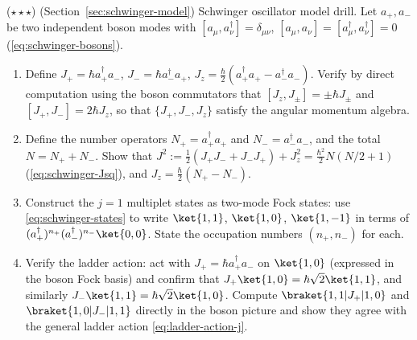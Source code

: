 \begin{problemset}
\item ($\star\star\star$) (Section~\ref{sec:schwinger-model}) Schwinger oscillator model drill. Let $a_+,a_-$ be two independent boson modes with $[a_\mu,a_\nu^\dagger] = \delta_{\mu\nu}$, $[a_\mu,a_\nu] = [a_\mu^\dagger,a_\nu^\dagger] = 0$ (\eqref{eq:schwinger-bosons}).
\begin{enumerate}
\item[(a)] Define $J_+ = \hbar a_+^\dagger a_-$, $J_- = \hbar a_-^\dagger a_+$, $J_z = \frac{\hbar}{2}(a_+^\dagger a_+ - a_-^\dagger a_-)$. Verify by direct computation using the boson commutators that $[J_z, J_\pm] = \pm\hbar J_\pm$ and $[J_+, J_-] = 2\hbar J_z$, so that $\{J_+, J_-, J_z\}$ satisfy the angular momentum algebra.
\item[(b)] Define the number operators $N_+ = a_+^\dagger a_+$ and $N_- = a_-^\dagger a_-$, and the total $N = N_+ + N_-$. Show that $J^2 := \frac12(J_+J_- + J_-J_+) + J_z^2 = \frac{\hbar^2}{2}N(N/2+1)$ (\eqref{eq:schwinger-Jsq}), and $J_z = \frac{\hbar}{2}(N_+ - N_-)$.
\item[(c)] Construct the $j=1$ multiplet states as two-mode Fock states: use \eqref{eq:schwinger-states} to write $\ket{1,1}$, $\ket{1,0}$, $\ket{1,-1}$ in terms of $(a_+^\dagger)^{n_+}(a_-^\dagger)^{n_-}\ket{0,0}$. State the occupation numbers $(n_+, n_-)$ for each.
\item[(d)] Verify the ladder action: act with $J_+ = \hbar a_+^\dagger a_-$ on $\ket{1,0}$ (expressed in the boson Fock basis) and confirm that $J_+\ket{1,0} = \hbar\sqrt{2}\ket{1,1}$, and similarly $J_-\ket{1,1} = \hbar\sqrt{2}\ket{1,0}$. Compute $\braket{1,1|J_+|1,0}$ and $\braket{1,0|J_-|1,1}$ directly in the boson picture and show they agree with the general ladder action \eqref{eq:ladder-action-j}.
\end{enumerate}


\end{problemset}
